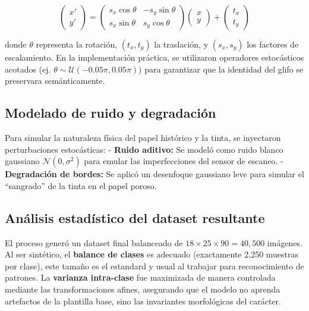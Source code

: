 \documentclass[
  spanish,
  us-letterpaper,
  DIV=11,
  numbers=noendperiod]{scrreprt}
\begin{document}
\[
\begin{pmatrix} x' \\ y' \end{pmatrix} = 
\begin{pmatrix} s_x \cos\theta & -s_y \sin\theta \\ s_x \sin\theta & s_y \cos\theta \end{pmatrix}
\begin{pmatrix} x \\ y \end{pmatrix} + 
\begin{pmatrix} t_x \\ t_y \end{pmatrix}
\]

donde \(\theta\) representa la rotación, \((t_x, t_y)\) la traslación, y
\((s_x, s_y)\) los factores de escalamiento. En la implementación
práctica, se utilizaron operadores estocásticos acotados (ej.
\(\theta \sim \mathcal{U}(-0.05\pi, 0.05\pi)\)) para garantizar que la
identidad del glifo se preservara semánticamente.

\subsection{Modelado de ruido y
degradación}\label{modelado-de-ruido-y-degradaciuxf3n}

Para simular la naturaleza física del papel histórico y la tinta, se
inyectaron perturbaciones estocásticas: - \textbf{Ruido aditivo:} Se
modeló como ruido blanco gaussiano \(\mathcal{N}(0, \sigma^2)\) para
emular las imperfecciones del sensor de escaneo. - \textbf{Degradación
de bordes:} Se aplicó un desenfoque gaussiano leve para simular el
``sangrado'' de la tinta en el papel poroso.

\subsection{Análisis estadístico del dataset
resultante}\label{anuxe1lisis-estaduxedstico-del-dataset-resultante}

El proceso generó un dataset final balanceado de
\(18 \times 25 \times 90 = 40,500\) imágenes. Al ser sintético, el
\textbf{balance de clases} es adecuado (exactamente 2,250 muestras por
clase), este tamaño es el estandard y usual al trabajar para
reconocimiento de patrones. La \textbf{varianza intra-clase} fue
maximizada de manera controlada mediante las transformaciones afines,
asegurando que el modelo no aprenda artefactos de la plantilla base,
sino las invariantes morfológicas del carácter.
\end{document}
